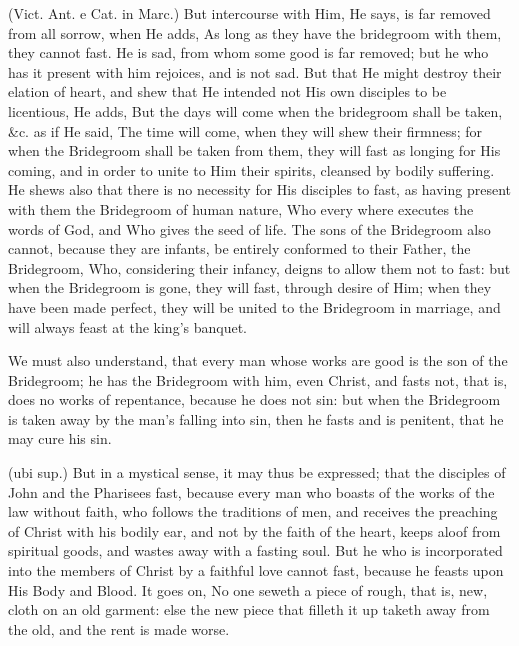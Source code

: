  (Vict. Ant. e Cat. in Marc.) But intercourse with Him, He says, is far removed from all sorrow, when He adds, As long as they have the bridegroom with them, they cannot fast. He is sad, from whom some good is far removed; but he who has it present with him rejoices, and is not sad. But that He might destroy their elation of heart, and shew that He intended not His own disciples to be licentious, He adds, But the days will come when the bridegroom shall be taken, \&c. as if He said, The time will come, when they will shew their firmness; for when the Bridegroom shall be taken from them, they will fast as longing for His coming, and in order to unite to Him their spirits, cleansed by bodily suffering. He shews also that there is no necessity for His disciples to fast, as having present with them the Bridegroom of human nature, Who every where executes the words of God, and Who gives the seed of life. The sons of the Bridegroom also cannot, because they are infants, be entirely conformed to their Father, the Bridegroom, Who, considering their infancy, deigns to allow them not to fast: but when the Bridegroom is gone, they will fast, through desire of Him; when they have been made perfect, they will be united to the Bridegroom in marriage, and will always feast at the king’s banquet.

 We must also understand, that every man whose works are good is the son of the Bridegroom; he has the Bridegroom with him, even Christ, and fasts not, that is, does no works of repentance, because he does not sin: but when the Bridegroom is taken away by the man’s falling into sin, then he fasts and is penitent, that he may cure his sin.

 (ubi sup.) But in a mystical sense, it may thus be expressed; that the disciples of John and the Pharisees fast, because every man who boasts of the works of the law without faith, who follows the traditions of men, and receives the preaching of Christ with his bodily ear, and not by the faith of the heart, keeps aloof from spiritual goods, and wastes away with a fasting soul. But he who is incorporated into the members of Christ by a faithful love cannot fast, because he feasts upon His Body and Blood. It goes on, No one seweth a piece of rough, that is, new, cloth on an old garment: else the new piece that filleth it up taketh away from the old, and the rent is made worse.

